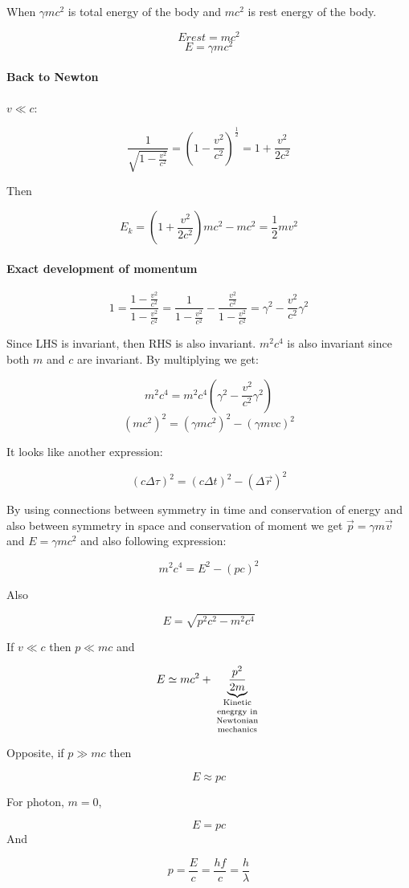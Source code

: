 When $ \gamma mc^2$ is total energy of the body and $mc^2$ is rest energy of the body.

$$E{rest} = mc^2$$
$$E = \gamma mc^2$$

\paragraph{Back to Newton} $v \ll c$:

$$\frac{1}{\sqrt{1-\frac{v^2}{c^2}}}= \left(1-\frac{v^2}{c^2}\right)^{\frac{1}{2}} = 1+\frac{v^2}{2c^2}$$
	
	Then 
	
	$$E_k =\left(1+\frac{v^2}{2c^2}\right)mc^2 - mc^2 = \frac{1}{2}mv^2$$ 
	
\paragraph{Exact development of momentum}

$$1 = \frac{1-\frac{v^2}{c^2}}{1-\frac{v^2}{c^2}} = \frac{1}{1-\frac{v^2}{c^2}} - \frac{\frac{v^2}{c^2}}{1-\frac{v^2}{c^2}} = \gamma^2 - \frac{v^2}{c^2}\gamma^2$$

Since LHS is invariant, then RHS is also invariant. $m^2c^4$ is also invariant since both $m$ and $c$ are invariant. By multiplying we get:

$$m^2c^4=m^2c^4\left(\gamma^2 - \frac{v^2}{c^2}\gamma^2\right)$$
$$\left( mc^2\right)^2 = \left( \gamma mc^2\right)^2  - \left( \gamma mvc\right)^2 $$

It looks like another expression:

$$\left( c \Delta \tau\right)^2 = \left( c \Delta t\right)^2 - \left( \Delta \vec{r} \right)^2$$

By using connections between symmetry in time and conservation of energy and also between symmetry in space and conservation of moment we get $\vec{p} = \gamma m \vec{v}$ and $E=\gamma mc^2$ and also following expression:

$$m^2c^4 = E^2 - \left(pc\right)^2$$

Also 

$$E = \sqrt{p^2c^2 - m^2c^4}$$

If $v \ll c$ then $p \ll mc$ and

$$E  \simeq mc^2 + \underbrace{\frac{p^2}{2m}}_{\parbox{1.5cm}{\centering \scriptsize Kinetic enegrgy in Newtonian mechanics}}$$
	
	Opposite, if $p \gg mc$ then
	
	$$E \approx pc$$
	
	For  photon, $m=0$,
	
	$$E = pc$$
And

$$p = \frac{E}{c} = \frac{hf}{c} = \frac{h}{\lambda}$$

